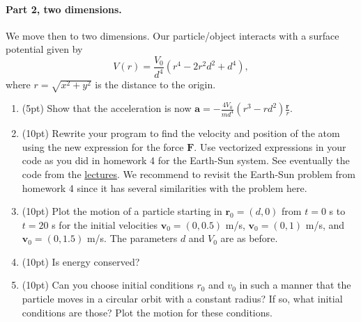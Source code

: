 \documentclass[%
oneside,                 %
final,                   %
10pt]{article}
\begin{document}
\noindent
\paragraph{Part 2, two dimensions.}
We move then to two dimensions. Our particle/object interacts with a surface potential given by
\[
V(r)=\frac{V_0}{d^4}\left(r^4-2r^2d^2+d^4\right),
\]
where $r=\sqrt{x^2+y^2}$ is the distance to the origin.

\begin{enumerate}
\item (5pt) Show that the acceleration is now $\bm{a}=-\frac{4V_0}{md^4}\left(r^3-rd^2\right)\frac{\bm{r}}{r}$.

\item (10pt) Rewrite your program to find the velocity and position of the atom using the new expression for the force $\bm{F}$. Use vectorized expressions in your code as you did in homework 4 for the Earth-Sun system. See eventually the code from the \href{{https://mhjensen.github.io/Physics321/doc/pub/energyconserv/html/energyconserv.html}}{lectures}.  We recommend to revisit the Earth-Sun problem from homework 4 since it has several similarities with the problem here.

\item (10pt) Plot the motion of a particle starting in $\bm{r}_0=(d,0)$ from $t=0$ s to $t=20$ s for the initial velocities $\bm{v}_0=(0,0.5)$ m/s, $\bm{v}_0=(0,1)$ m/s, and $\bm{v}_0=(0,1.5)$ m/s. The parameters $d$ and $V_0$ are as before.

\item (10pt) Is energy conserved? 

\item (10pt) Can you choose initial conditions $r_0$ and $v_0$ in such a manner that the particle moves in a circular orbit with a constant radius? If so, what initial conditions are those? Plot the motion for these conditions.
\end{enumerate}

\noindent

\end{document}
